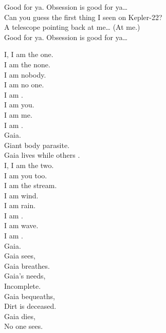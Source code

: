 Good for ya. Obsession is good for ya… \\

Can you guess the first thing I seen on Kepler-22? \\
A telescope pointing back at me… (At me.) \\

Good for ya. Obsession is good for ya… \\





I, I am the one. \\
I am the none. \\
I am nobody. \\
I am no one. \\
I am . \\
I am you. \\
I am me. \\

I am . \\
Gaia. \\

Giant body parasite. \\
Gaia lives while others . \\

I, I am the two. \\
I am you too. \\
I am the stream. \\
I am wind. \\
I am rain. \\
I am . \\
I am wave. \\

I am . \\
Gaia. \\

Gaia sees, \\
Gaia breathes. \\
Gaia's needs, \\
Incomplete. \\
Gaia bequeaths, \\
Dirt is deceased. \\
Gaia dies, \\
No one sees. \\


